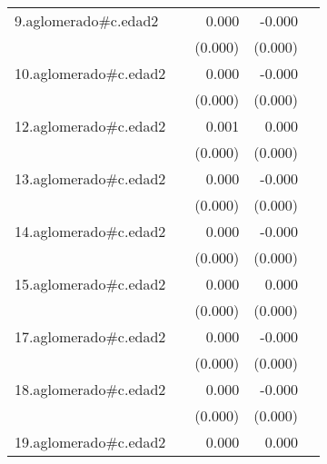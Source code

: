 {\begin{longtable}{l*{4}{D{.}{.}{-1}}}
\addlinespace
9.aglomerado#c.edad2&                     &       0.000\sym{***}&      -0.000\sym{*}  &                     \\
            &                     &     (0.000)         &     (0.000)         &                     \\
\addlinespace
10.aglomerado#c.edad2&                     &       0.000\sym{**} &      -0.000         &                     \\
            &                     &     (0.000)         &     (0.000)         &                     \\
\addlinespace
12.aglomerado#c.edad2&                     &       0.001\sym{***}&       0.000\sym{*}  &                     \\
            &                     &     (0.000)         &     (0.000)         &                     \\
\addlinespace
13.aglomerado#c.edad2&                     &       0.000\sym{***}&      -0.000         &                     \\
            &                     &     (0.000)         &     (0.000)         &                     \\
\addlinespace
14.aglomerado#c.edad2&                     &       0.000\sym{*}  &      -0.000\sym{***}&                     \\
            &                     &     (0.000)         &     (0.000)         &                     \\
\addlinespace
15.aglomerado#c.edad2&                     &       0.000         &       0.000         &                     \\
            &                     &     (0.000)         &     (0.000)         &                     \\
\addlinespace
17.aglomerado#c.edad2&                     &       0.000\sym{**} &      -0.000         &                     \\
            &                     &     (0.000)         &     (0.000)         &                     \\
\addlinespace
18.aglomerado#c.edad2&                     &       0.000         &      -0.000         &                     \\
            &                     &     (0.000)         &     (0.000)         &                     \\
\addlinespace
19.aglomerado#c.edad2&                     &       0.000\sym{***}&       0.000         &                     \\

\end{longtable}}

